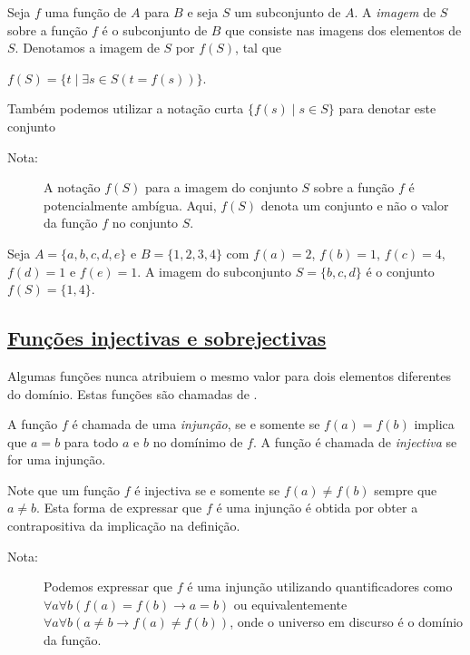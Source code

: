 \begin{defn}
\label{def318}
Seja $f$ uma função de $A$ para  $B$ e seja $S$ um subconjunto de $A$. A
\emph{imagem} de $S$ sobre a função $f$ é o subconjunto de $B$ que consiste nas
imagens dos elementos de $S$. Denotamos a imagem de $S$ por $f(S)$, tal que
\begin{center}
$f(S) = \{t \mid \exists s \in S (t = f(s))\}$.
\end{center}
Também podemos utilizar a notação curta $\{f(s) \mid s \in S\}$ para denotar
este conjunto
\begin{description}
\item[Nota:]A notação $f(S)$ para a imagem do conjunto $S$ sobre a função $f$ é
potencialmente ambígua. Aqui, $f(S)$ denota um conjunto e não o valor da função
$f$ no conjunto $S$.
\end{description}
\end{defn}

\begin{exmp}

Seja $A = \{a,b,c,d,e\}$ e $B=\{1,2,3,4\}$ com $f(a)=2$, $f(b)=1$, $f(c)=4$,
$f(d)=1$ e $f(e)=1$. A imagem do subconjunto $S=\{b,c,d\}$ é o conjunto
$f(S)=\{1,4\}$.
\end{exmp}


\subsection*{\underline{Funções injectivas e sobrejectivas}}

Algumas funções nunca atribuiem o mesmo valor para dois elementos diferentes do
domínio. Estas funções são chamadas de .

\begin{defn}
\label{def320}
A função $f$ é chamada de uma \emph{injunção}, se e somente se $f(a) = f(b)$
implica que $a=b$ para todo $a$ e $b$ no domínimo de $f$. A função é chamada de
\emph{injectiva} se for uma injunção.
\end{defn}

Note que um função $f$ é injectiva se e somente se $f(a) \neq f(b)$ sempre que
$a \neq b$. Esta forma de expressar que $f$ é uma injunção é obtida por obter a
contrapositiva da implicação na definição.

\begin{description}
\item[Nota:]Podemos expressar que $f$ é uma injunção utilizando quantificadores
como $\forall a\forall b (f(a)=f(b) \to a = b)$ ou equivalentemente $\forall
a\forall b(a \neq b \to f(a) \neq f(b))$, onde o universo em discurso é o
domínio da função.
\end{description}

